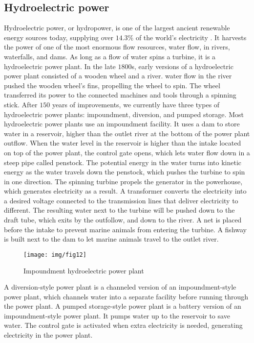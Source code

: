 \documentclass{article}
\begin{document}
\subsection{Hydroelectric power}
Hydroelectric power, or hydropower, is one of the largest ancient renewable energy sources today, supplying over $14.3\%$ of the world’s electricity \cite{cite15}. It harvests the power of one of the most enormous flow resources, water flow, in rivers, waterfalls, and dams. As long as a flow of water spins a turbine, it is a hydroelectric power plant. 
In the late $1800$s, early versions of a hydroelectric power plant consisted of a wooden wheel and a river. water flow in the river pushed the wooden wheel’s fins, propelling the wheel to spin. The wheel transferred its power to the connected machines and tools through a spinning stick.  After $150$ years of improvements, we currently have three types of hydroelectric power plants: impoundment, diversion, and pumped storage. 
Most hydroelectric power plants use an impoundment facility. It uses a dam to store water in a reservoir, higher than the outlet river at the bottom of the power plant outflow. When the water level in the reservoir is higher than the intake located on top of the power plant, the control gate opens, which lets water flow down in a steep pipe called penstock. The potential energy in the water turns into kinetic energy as the water travels down the penstock, which pushes the turbine to spin in one direction. The spinning turbine propels the generator in the powerhouse, which generates electricity as a result. A transformer converts the electricity into a desired voltage connected to the transmission lines that deliver electricity to different. The resulting water next to the turbine will be pushed down to the draft tube, which exits by the outfollow, and down to the river. A net is placed before the intake to prevent marine animals from entering the turbine. A fishway is built next to the dam to let marine animals travel to the outlet river. 
\begin{figure}[htbp]
    \center
    \texttt{[image: img/fig12]}
    \caption{Impoundment hydroelectric power plant}
\end{figure}
A diversion-style power plant is a channeled version of an impoundment-style power plant, which channels water into a separate facility before running through the power plant. A pumped storage-style power plant is a battery version of an impoundment-style power plant. It pumps water up to the reservoir to save water. The control gate is activated when extra electricity is needed, generating electricity in the power plant. 
\end{document}
